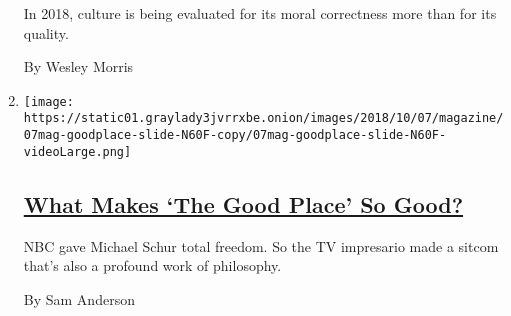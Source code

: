 \begin{enumerate}
  In 2018, culture is being evaluated for its moral correctness more
  than for its quality.

  By Wesley Morris
\item
  \texttt{[image: https://static01.graylady3jvrrxbe.onion/images/2018/10/07/magazine/07mag-goodplace-slide-N60F-copy/07mag-goodplace-slide-N60F-videoLarge.png]}

  \hypertarget{what-makes-the-good-place-so-good}{%
  \subsection{\texorpdfstring{\href{/interactive/2018/10/04/magazine/good-place-michael-schur-philosophy.html}{What
  Makes `The Good Place' So
  Good?}}{What Makes `The Good Place' So Good?}}\label{what-makes-the-good-place-so-good}}

  NBC gave Michael Schur total freedom. So the TV impresario made a
  sitcom that's also a profound work of philosophy.

  By Sam Anderson
\end{enumerate}

